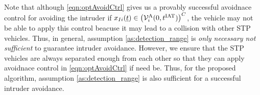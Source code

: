 Note that although \eqref{eqn:optAvoidCtrl} gives us a provably successful avoidnace control for avoiding the intruder if $x_{I i}(\underline{t}) \in \left(\mathcal{V}^{\text{A}}_{i}(0, t^\text{IAT})\right)^C$, the vehicle may not be able to apply this control beacuse it may lead to a collision with other STP vehicles. Thus, in general, assumption \ref{as:detection_range} is \textit{only necessary not sufficient} to guarantee intruder avoidance. However, we ensure that the STP vehicles are always separated enough from each other so that they can apply avoidnace control in \eqref{eqn:optAvoidCtrl} if need be. Thus, for the proposed algorithm, assumption \ref{as:detection_range} is also sufficient for a successful intruder avoidance.
